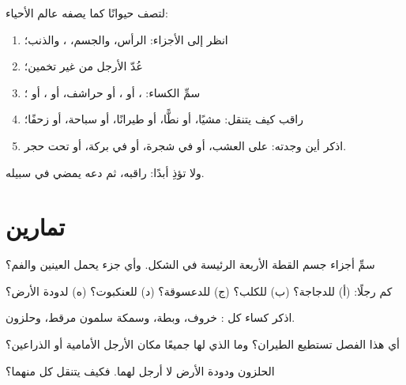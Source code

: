 \begin{method}\label{met:g1:animals-around-us:observe}
لتصف حيوانًا كما يصفه عالم الأحياء:
\begin{enumerate}
  \item انظر إلى الأجزاء: الرأس، والجسم، ، والذنب؛
  \item عُدّ الأرجل من غير تخمين؛
  \item سمِّ الكساء: ، أو ، أو حراشف، أو ، أو ؛
  \item راقب كيف يتنقل: مشيًا، أو نطًّا، أو طيرانًا، أو سباحة، أو زحفًا؛
  \item اذكر أين وجدته: على العشب، أو في شجرة، أو في بركة، أو تحت حجر.
\end{enumerate}
ولا تؤذِ  أبدًا: راقبه، ثم دعه يمضي في سبيله.
\end{method}

\section{تمارين}

\begin{exercise}[$\star$]\label{exo:g1:animals-around-us:1}
سمِّ أجزاء جسم القطة الأربعة الرئيسة في الشكل. وأي جزء يحمل
العينين والفم؟
\end{exercise}

\begin{exercise}[$\star$]\label{exo:g1:animals-around-us:2}
كم رجلًا: (أ) للدجاجة؟ (ب) للكلب؟ (ج) للدعسوقة؟ (د) للعنكبوت؟
(ه) لدودة الأرض؟
\end{exercise}

\begin{exercise}[$\star$]\label{exo:g1:animals-around-us:3}
اذكر كساء كل : خروف، وبطة، وسمكة سلمون مرقط، وحلزون.
\end{exercise}

\begin{exercise}[$\star$]\label{exo:g1:animals-around-us:4}
أي  هذا الفصل تستطيع الطيران؟ وما الذي لها جميعًا مكان
الأرجل الأمامية أو الذراعين؟
\end{exercise}

\begin{exercise}[$\star$]\label{exo:g1:animals-around-us:5}
الحلزون ودودة الأرض لا أرجل لهما. فكيف يتنقل كل منهما؟
\end{exercise}

